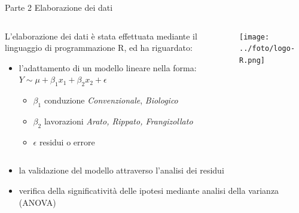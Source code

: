 \documentclass[10pt]{beamer}
\begin{document}
\begin{frame}{Parte 2 \small{Elaborazione dei dati}}
\begin{minipage}[0.2\textheight]{\textwidth}
\begin{columns}[T]
\begin{column}{0.8\textwidth}
  L'elaborazione dei dati è stata effettuata mediante il linguaggio di
  programmazione R, ed ha riguardato:
  \begin{itemize}
    \item l'adattamento di un modello lineare nella forma:
    \vspace{0.25cm}
    $Y \sim \mu + \beta_1x_1 + \beta_2x_2 + \epsilon$

    \begin{itemize}

      \item $\beta_1$ conduzione \newline
      \emph{Convenzionale}, \emph{Biologico}

      \item $\beta_2$ lavorazioni \newline \emph{Arato, Rippato,
        Frangizollato}

      \item$\epsilon$ residui o errore
    \end{itemize}
  \end{itemize}
\end{column}
\begin{column}{0.2\textwidth}
\texttt{[image: ../foto/logo-R.png]}
\end{column}
\end{columns}
\end{minipage}

\begin{itemize}
  \item la validazione del modello attraverso l'analisi
  dei residui 
  \item verifica della significatività delle
  ipotesi mediante analisi della varianza (ANOVA)
\end{itemize}
\end{frame}


\end{document}
